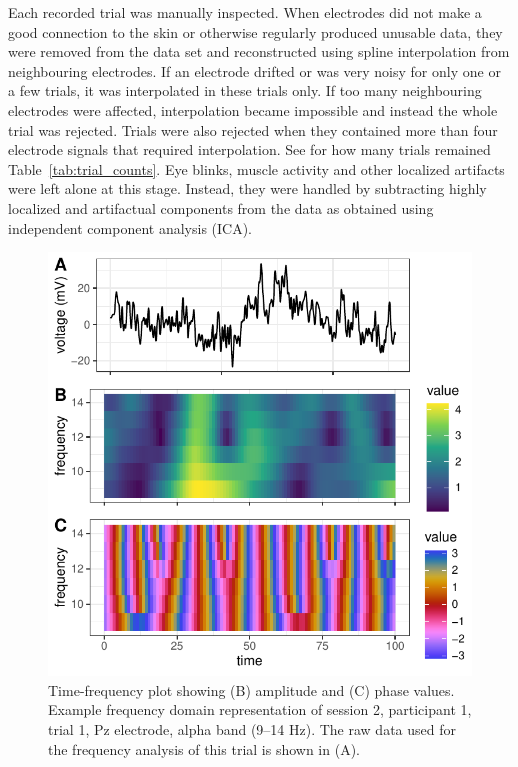 Each recorded trial was manually inspected. When electrodes did not make a good
connection to the skin or otherwise regularly produced unusable data, they were
removed from the data set and reconstructed using spline interpolation from
neighbouring electrodes. If an electrode drifted or was very noisy for only one
or a few trials, it was interpolated in these trials only. If too many
neighbouring electrodes were affected, interpolation became impossible and
instead the whole trial was rejected. Trials were also rejected when they
contained more than four electrode signals that required interpolation. See for
how many trials remained Table~\ref{tab:trial_counts}. Eye blinks, muscle
activity and other localized artifacts were left alone at this stage. Instead,
they were handled by subtracting highly localized and artifactual components
from the data as obtained using independent component analysis (ICA).

\begin{figure}[!htpb]
  \includegraphics[width=\linewidth]{../stats/results/freqdomain.pdf}
  \caption{Time-frequency plot showing (B) amplitude and (C) phase values. Example frequency domain representation of session 2, participant 1, trial 1, Pz electrode, alpha band (9--14 Hz). The raw data used for the frequency analysis of this trial is shown in (A).}
  \label{fig:freqanalysis}
\end{figure}

